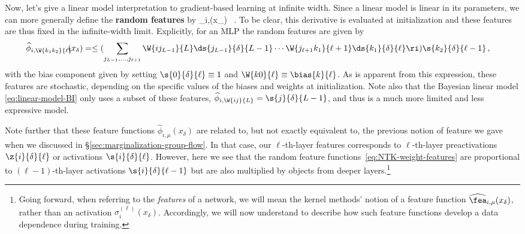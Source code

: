 Now, let's give a linear model interpretation to gradient-based learning at infinite width. 
Since a linear model is linear in its parameters, we can more generally define the \textbf{random features} by
\be\label{eq:feature-function-stochastic}
 \widehat{\fea}_{i,\mu}(x_{\delta}) \equiv {}  \, .
\ee
To be clear, this derivative is evaluated at initialization and these features are thus fixed in the infinite-width limit.
Explicitly, for an MLP the random features are given by
\begin{align}
 \widehat{\phi}_{i, \W{k_1 k_2}{\ell}}\!\!\!(x_{\delta}) &=  \le(\sum_{j_{L-1}, \ldots, j_{\ell+1}}\W{i j_{L-1}}{L} \ds{j_{L-1}}{\delta}{L-1} \cdots \W{j_{\ell+1} k_1}{\ell+1} \ds{k_1}{\delta}{\ell}\ri) \s{k_2}{\delta}{\ell-1} \, ,
 \label{eq:NTK-weight-features}
\end{align}
with the bias component given by setting $\s{0}{\delta}{\ell}\equiv1$ and $\W{k 0}{\ell}\equiv\bias{k}{\ell}$. As is apparent from this expression, these features are stochastic, depending on the specific values of the biases and weights at initialization. Note also that the Bayesian linear model \eqref{eq:linear-model-BI} only uses a subset of these features, $ \widehat{\phi}_{i, \W{i j}{L}}=\s{j}{\delta}{L-1}$, and thus is a much more limited and less expressive model.


Note further that these feature functions $\widehat{\phi}_{i,\mu}(x_{\delta})$ are related to, but not exactly equivalent to,  the previous notion of feature we gave when we discussed  in \S\ref{sec:marginalization-group-flow}. In that case, our $\ell$-th-layer features corresponds to $\ell$-th-layer preactivations $\z{i}{\delta}{\ell}$ or activations $\s{i}{\delta}{\ell}$. However, here we see that the random feature functions~\eqref{eq:NTK-weight-features}
are proportional to $(\ell-1)$-th-layer activations $\s{i}{\delta}{\ell-1}$ but are also multiplied by objects from deeper layers.\footnote{
Going forward, when referring to the \emph{features} of a network, we will mean the kernel methods' notion of a feature function $\widehat{\fea}_{i,\mu}(x_{\delta})$,
rather than an activation $\sigma_i^{(\ell)}(x_\delta)$. Accordingly, we will now understand  to describe how such feature functions develop a data dependence during training.
}





